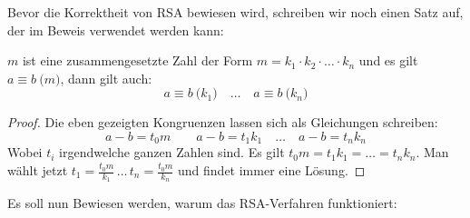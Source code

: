 \noindent
Bevor die Korrektheit von RSA bewiesen wird, schreiben wir noch einen Satz auf, der im
Beweis verwendet werden kann:

\begin{satz}
  \label{satz:composite-mod}
  $m$ ist eine zusammengesetzte Zahl der Form $m = k_1 \cdot k_2 \cdot \ldots \cdot k_n$ und
  es gilt $a \equiv b \pod{m}$, dann gilt auch:
  \begin{equation*}
    a \equiv b \pod{k_1} \quad\ldots\quad a \equiv b \pod{k_n}
  \end{equation*}
\end{satz}
\begin{proof}
  Die eben gezeigten Kongruenzen lassen sich als Gleichungen schreiben:
  \begin{equation*}
    a - b = t_0 m \qquad a - b = t_1k_1 \quad\ldots\quad a - b = t_nk_n
  \end{equation*}
  Wobei $t_i$ irgendwelche ganzen Zahlen sind. Es gilt $t_0m = t_1k_1 = \ldots = t_nk_n$.
  Man wählt jetzt $t_1 = \frac{t_0m}{k_1} \,\ldots\, t_n = \frac{t_0m}{k_n}$
  und findet immer eine Lösung.
\end{proof}

\noindent
Es soll nun Bewiesen werden, warum das RSA-Verfahren funktioniert:

